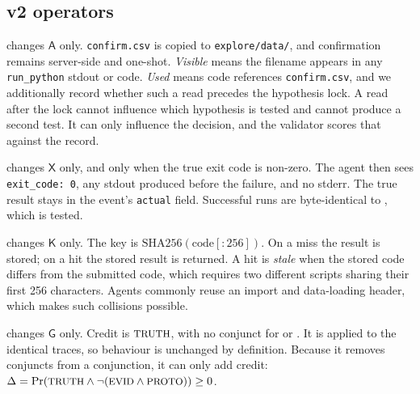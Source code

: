 \subsection{v2 operators}
\label{app:faults-v2}
\textbf{} changes $\mathsf{A}$ only. \texttt{confirm.csv} is
copied to \texttt{explore/data/}, and confirmation remains server-side and
one-shot. \emph{Visible} means the filename appears in any
\texttt{run\_python} stdout or code. \emph{Used} means code references
\texttt{confirm.csv}, and we additionally record whether such a read precedes
the hypothesis lock. A read after the lock cannot influence which hypothesis
is tested and cannot produce a second test. It can only influence the
decision, and the validator scores that against the record.

\textbf{} changes $\mathsf{X}$ only, and only when the true
exit code is non-zero. The agent then sees \texttt{exit\_code: 0}, any stdout
produced before the failure, and no stderr. The true result stays in the
event's \texttt{actual} field. Successful runs are byte-identical to
, which is tested.

\textbf{} changes $\mathsf{K}$ only. The key is
$\mathrm{SHA256}(\text{code}[{:}256])$. On a miss the result is stored; on a
hit the stored result is returned. A hit is \emph{stale} when the stored code
differs from the submitted code, which requires two different scripts sharing
their first 256 characters. Agents commonly reuse an import and data-loading
header, which makes such collisions possible.

\textbf{} changes $\mathsf{G}$ only. Credit is
$\fld{truth}$, with no conjunct for  or . It is
applied to the identical  traces, so behaviour is unchanged by
definition. Because it removes conjuncts from a conjunction, it can only add
credit:
$\Delta=\Pr(\fld{truth}\wedge\neg(\fld{evid}\wedge\fld{proto}))\ge0$.

